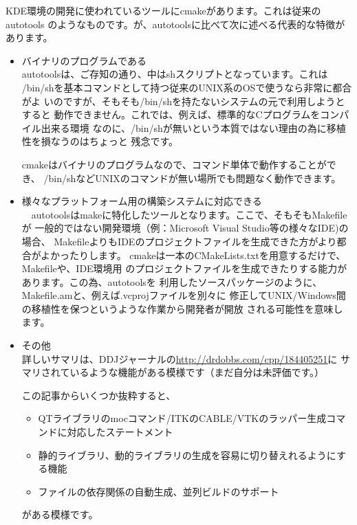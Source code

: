 \documentclass[mingoth,a4paper]{jsarticle}
\begin{document}
KDE環境の開発に使われているツールにcmakeがあります。これは従来のautotools
のようなものです。が、autotoolsに比べて次に述べる代表的な特徴があります。

\begin{itemize}
\item バイナリのプログラムである\\
autotoolsは、ご存知の通り、中はshスクリプトとなっています。これは
/bin/shを基本コマンドとして持つ従来のUNIX系のOSで使うなら非常に都合がよ
いのですが、そもそも/bin/shを持たないシステムの元で利用しようとすると
動作できません。これでは、例えば、標準的なCプログラムをコンパイル出来る環境
なのに、/bin/shが無いという本質ではない理由の為に移植性を損なうのはちょっと
残念です。

 cmakeはバイナリのプログラムなので、コマンド単体で動作することができ、
/bin/shなどUNIXのコマンドが無い場所でも問題なく動作できます。

\item 様々なプラットフォーム用の構築システムに対応できる\\
　autotoolsはmakeに特化したツールとなります。ここで、そもそもMakefileが
一般的ではない開発環境（例：Microsoft Visual Studio等の様々なIDE)の場合、
MakefileよりもIDEのプロジェクトファイルを生成できた方がより都合がよかったりします。
  cmakeは一本のCMakeLists.txtを用意するだけで、Makefileや、IDE環境用
のプロジェクトファイルを生成できたりする能力があります。この為、autotoolsを
利用したソースパッケージのように、Makefile.amと、例えば.vcprojファイルを別々に
修正してUNIX/Windows間の移植性を保つというような作業から開発者が開放
される可能性を意味します。

\item その他\\
 詳しいサマリは、DDJジャーナルの\url{http://drdobbs.com/cpp/184405251}に
サマリされているような機能がある模様です（まだ自分は未評価です。）

この記事からいくつか抜粋すると、

\begin{itemize}
\item QTライブラリのmocコマンド/ITKのCABLE/VTKのラッパー生成コマンドに対応したステートメント
\item 静的ライブラリ、動的ライブラリの生成を容易に切り替えれるようにする機能
\item ファイルの依存関係の自動生成、並列ビルドのサポート
\end{itemize}

がある模様です。
\end{itemize}
\end{document}
